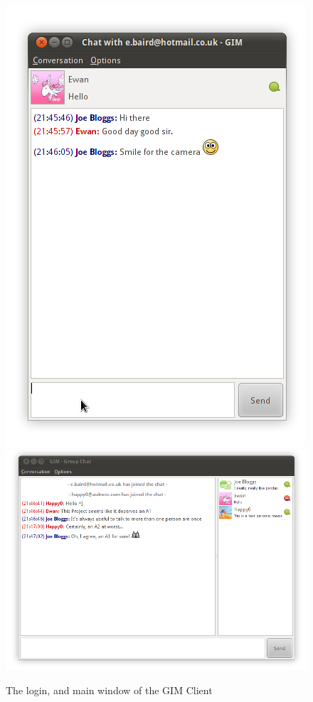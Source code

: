 \begin{figure}
    \begin{center}
        \includegraphics[scale=0.5]{Implementation/diagrams/single_chat.png}
        \includegraphics[scale=0.5]{Implementation/diagrams/group_chat.png}
        \caption{The login, and main window of the GIM Client}
        \label{MainWindowDia}
    \end{center}
\end{figure}

